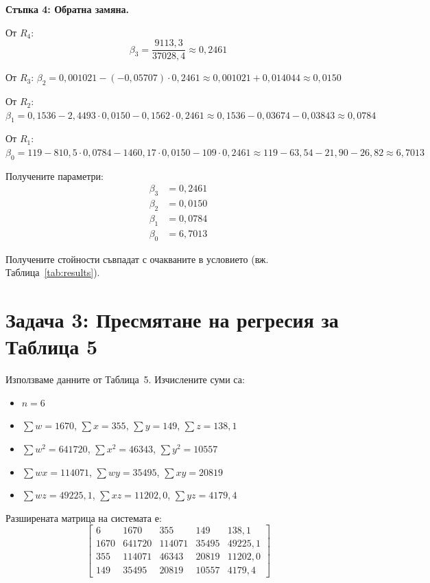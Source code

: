 \textbf{Стъпка 4: Обратна замяна.}

От $R_4$:
\[
\beta_3 = \frac{9113{,}3}{37028{,}4} \approx 0{,}2461
\]

От $R_3$: $\beta_2 = 0{,}001021 - (-0{,}05707)\cdot 0{,}2461 \approx 0{,}001021 + 0{,}014044 \approx 0{,}0150$

От $R_2$: $\beta_1 = 0{,}1536 - 2{,}4493\cdot 0{,}0150 - 0{,}1562\cdot 0{,}2461 \approx 0{,}1536 - 0{,}03674 - 0{,}03843 \approx 0{,}0784$

От $R_1$: $\beta_0 = 119 - 810{,}5\cdot 0{,}0784 - 1460{,}17\cdot 0{,}0150 - 109\cdot 0{,}2461 \approx 119 - 63{,}54 - 21{,}90 - 26{,}82 \approx 6{,}7013$

Получените параметри:
\begin{align*}
\beta_3 &= 0{,}2461 \\
\beta_2 &= 0{,}0150 \\
\beta_1 &= 0{,}0784 \\
\beta_0 &= 6{,}7013
\end{align*}

Получените стойности съвпадат с очакваните в условието (вж. Таблица~\ref{tab:results}).

\section{Задача 3: Пресмятане на регресия за Таблица 5}
\label{sec:table5}
Използваме данните от Таблица~5. Изчислените суми са:
\begin{itemize}
    \item $n = 6$
    \item $\sum w = 1670$, $\sum x = 355$, $\sum y = 149$, $\sum z = 138{,}1$
    \item $\sum w^2 = 641720$, $\sum x^2 = 46343$, $\sum y^2 = 10557$
    \item $\sum wx = 114071$, $\sum wy = 35495$, $\sum xy = 20819$
    \item $\sum wz = 49225{,}1$, $\sum xz = 11202{,}0$, $\sum yz = 4179{,}4$
\end{itemize}

Разширената матрица на системата е:
\begin{equation}
\label{eq:system5}
\left[\begin{array}{cccc|c}
6    & 1670   & 355    & 149   & 138{,}1   \\
1670 & 641720 & 114071 & 35495 & 49225{,}1 \\
355  & 114071 & 46343  & 20819 & 11202{,}0 \\
149  & 35495  & 20819  & 10557 & 4179{,}4
\end{array}\right]
\end{equation}

